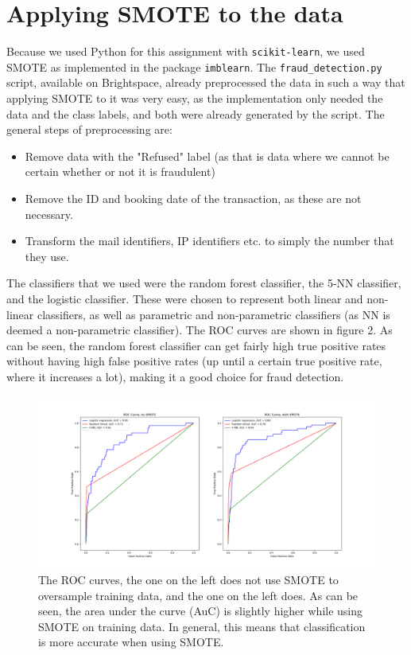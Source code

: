 \documentclass[]{article}
\begin{document}
\section{Applying SMOTE to the data}
Because we used Python for this assignment with \texttt{scikit-learn}, we used SMOTE as implemented in the package \texttt{imblearn}. The \texttt{fraud\_detection.py} script, available on Brightspace, already preprocessed the data in such a way that applying SMOTE to it was very easy, as the implementation only needed the data and the class labels, and both were already generated by the script. The general steps of preprocessing are: 
\begin{itemize}
	\item Remove data with the "Refused" label (as that is data where we cannot be certain whether or not it is fraudulent)
	\item Remove the ID and booking date of the transaction, as these are not necessary.
	\item Transform the mail identifiers, IP identifiers etc. to simply the number that they use.
\end{itemize}
The classifiers that we used were the random forest classifier, the 5-NN classifier, and the logistic classifier. These were chosen to represent both linear and non-linear classifiers, as well as parametric and non-parametric classifiers (as NN is deemed a non-parametric classifier). The ROC curves are shown in figure 2. As can be seen, the random forest classifier can get fairly high true positive rates without having high false positive rates (up until a certain true positive rate, where it increases a lot), making it a good choice for fraud detection.
\begin{figure}[h!]
	\centering
	\includegraphics[scale = 0.27]{Visualizations/ROC_curves}
	\caption{The ROC curves, the one on the left does not use SMOTE to oversample training data, and the one on the left does. As can be seen, the area under the curve (AuC) is slightly higher while using SMOTE on training data. In general, this means that classification is more accurate when using SMOTE.}
\end{figure}
\clearpage
\end{document}
